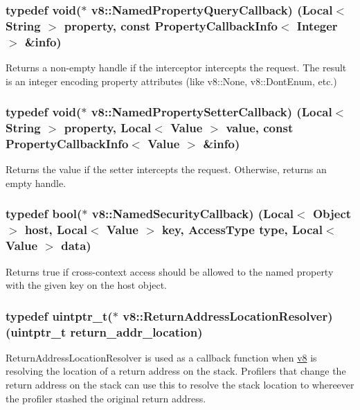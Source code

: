 \subsubsection[{Named\+Property\+Query\+Callback}]{\setlength{\rightskip}{0pt plus 5cm}typedef void($\ast$ v8\+::\+Named\+Property\+Query\+Callback) ({\bf Local}$<$ {\bf String} $>$ property, const {\bf Property\+Callback\+Info}$<$ {\bf Integer} $>$ \&info)}\label{namespacev8_ac135beae5f0c8b290255accb438f990e}
Returns a non-\/empty handle if the interceptor intercepts the request. The result is an integer encoding property attributes (like v8\+::\+None, v8\+::\+Dont\+Enum, etc.) \hypertarget{namespacev8_a9587769513971dc7cb301b740d9e66b6}{}
\subsubsection[{Named\+Property\+Setter\+Callback}]{\setlength{\rightskip}{0pt plus 5cm}typedef void($\ast$ v8\+::\+Named\+Property\+Setter\+Callback) ({\bf Local}$<$ {\bf String} $>$ property, {\bf Local}$<$ {\bf Value} $>$ value, const {\bf Property\+Callback\+Info}$<$ {\bf Value} $>$ \&info)}\label{namespacev8_a9587769513971dc7cb301b740d9e66b6}
Returns the value if the setter intercepts the request. Otherwise, returns an empty handle. \hypertarget{namespacev8_ab5cafda0c556bba990c660ce9c904e0d}{}
\subsubsection[{Named\+Security\+Callback}]{\setlength{\rightskip}{0pt plus 5cm}typedef bool($\ast$ v8\+::\+Named\+Security\+Callback) ({\bf Local}$<$ {\bf Object} $>$ host, {\bf Local}$<$ {\bf Value} $>$ key, {\bf Access\+Type} type, {\bf Local}$<$ {\bf Value} $>$ data)}\label{namespacev8_ab5cafda0c556bba990c660ce9c904e0d}
Returns true if cross-\/context access should be allowed to the named property with the given key on the host object. \hypertarget{namespacev8_a8ce54c75241be41ff6a25e9944eefd2a}{}
\subsubsection[{Return\+Address\+Location\+Resolver}]{\setlength{\rightskip}{0pt plus 5cm}typedef uintptr\+\_\+t($\ast$ v8\+::\+Return\+Address\+Location\+Resolver) (uintptr\+\_\+t return\+\_\+addr\+\_\+location)}\label{namespacev8_a8ce54c75241be41ff6a25e9944eefd2a}
Return\+Address\+Location\+Resolver is used as a callback function when \hyperlink{namespacev8}{v8} is resolving the location of a return address on the stack. Profilers that change the return address on the stack can use this to resolve the stack location to whereever the profiler stashed the original return address.


